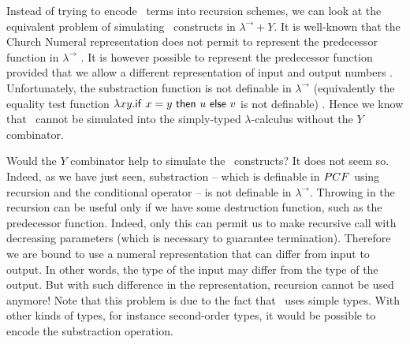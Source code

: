 \documentclass{article}
\begin{document}
Instead of trying to encode  \pcf\ terms into recursion schemes, we
can look at the equivalent problem of simulating \pcf\ constructs in
$\lambda^\rightarrow + Y$. It is well-known that the Church Numeral
representation does not permit to represent the predecessor function
in $\lambda^\rightarrow$ \cite{DBLP:journals/jacm/FortuneLO83}. It
is however possible to represent the predecessor function provided
that we allow a different representation of input and output numbers
\cite{DBLP:journals/jacm/FortuneLO83}. Unfortunately, the
substraction function is not definable in $\lambda^\rightarrow$
(equivalently  the equality test function $\lambda xy. {\sf if\ } x
= y {\sf\ then\ } u {\sf\ else\ } v$ is not definable)
\cite{DBLP:journals/jacm/FortuneLO83}. Hence we know that \pcf\
cannot be simulated into the simply-typed $\lambda$-calculus without
the $Y$ combinator.

Would the $Y$ combinator help to simulate the \pcf\ constructs? It
does not seem so. Indeed, as we have just seen, substraction --
which is definable in ${PCF}$ using recursion and the conditional
operator -- is not definable in $\lambda^\rightarrow$. Throwing in
the recursion can be useful only if we have some destruction
function, such as the predecessor function. Indeed, only this can
permit us to make recursive call with decreasing parameters (which
is necessary to guarantee termination). Therefore we are bound to
use a numeral representation that can differ from input to output.
In other words, the type of the input may differ from the type of
the output. But with such difference in the representation,
recursion cannot be used anymore! Note that this problem is due to
the fact that \pcf\ uses simple types. With other kinds of types,
for instance second-order types, it would be possible to encode the
substraction operation.

%
%
%
\end{document}
